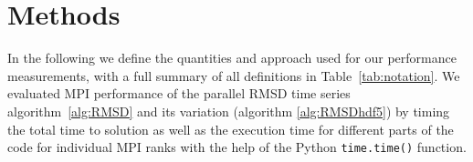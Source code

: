 
\section{Methods}
\label{sec:methods}


In the following we define the quantities and approach used for our performance measurements, with a full summary of all definitions in Table~\ref{tab:notation}.
We evaluated MPI performance of the parallel RMSD time series algorithm~\ref{alg:RMSD} and its variation (algorithm \ref{alg:RMSDhdf5}) by timing the total time to solution as well as the execution time for different parts of the code for individual MPI ranks with the help of the Python \texttt{time.time()} function.


